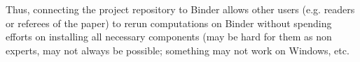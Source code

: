 \documentclass{deliverablereport}
\begin{document}
Thus, connecting the project repository to Binder allows other users
(e.g. readers or referees of the paper) to rerun computations on Binder
without spending efforts on installing all necessary components
(may be hard for them as non experts, may not always be possible;
something may not work on Windows, etc.


\newpage
{}
\printbibliography
\end{document}
